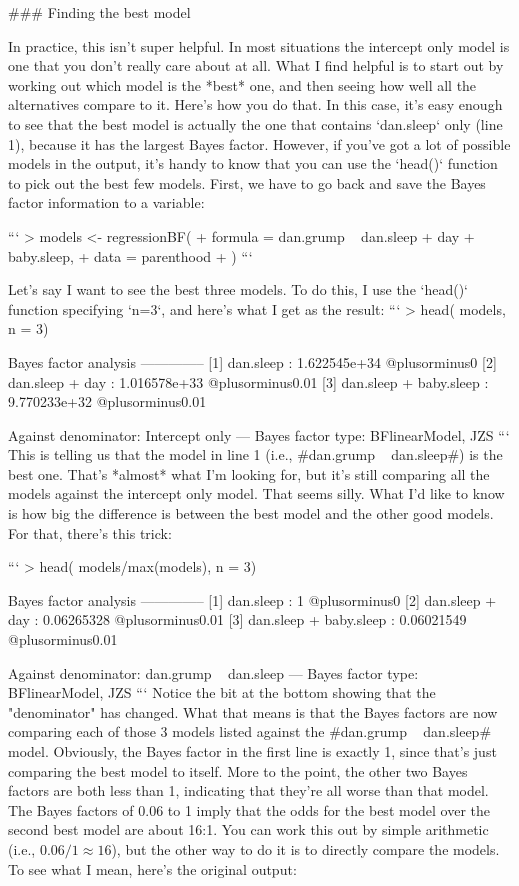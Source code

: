 ### Finding the best model

In practice, this isn't super helpful. In most situations the intercept only model is one that you don't really care about at all. What I find helpful is to start out by working out which model is the *best* one, and then seeing how well all the alternatives compare to it. Here's how you do that. In this case, it's easy enough to see that the best model is actually the one that contains `dan.sleep` only (line 1), because it has the largest Bayes factor. However, if you've got a lot of possible models in the output, it's handy to know that you can use the `head()` function to pick out the best few models. First, we have to go back and save the Bayes factor information to a variable:

```
> models <- regressionBF(
+    formula = dan.grump ~ dan.sleep + day + baby.sleep,
+    data = parenthood
+ )
```


Let's say I want to see the best three models. To do this, I use the `head()` function specifying `n=3`, and here's what I get as the result:
```
> head( models, n = 3)

Bayes factor analysis
--------------
[1] dan.sleep              : 1.622545e+34 @plusorminus0%
[2] dan.sleep + day        : 1.016578e+33 @plusorminus0.01%
[3] dan.sleep + baby.sleep : 9.770233e+32 @plusorminus0.01%

Against denominator:
  Intercept only 
---
Bayes factor type: BFlinearModel, JZS
```
This is telling us that the model in line 1 (i.e., \rtextverb#dan.grump ~ dan.sleep#) is the best one. That's *almost* what I'm looking for, but it's still comparing all the models against the intercept only model. That seems silly. What I'd like to know is how big the difference is between the best model and the other good models. For that, there's this trick:



```
> head( models/max(models), n = 3)

Bayes factor analysis
--------------
[1] dan.sleep              : 1          @plusorminus0%
[2] dan.sleep + day        : 0.06265328 @plusorminus0.01%
[3] dan.sleep + baby.sleep : 0.06021549 @plusorminus0.01%

Against denominator:
  dan.grump ~ dan.sleep 
---
Bayes factor type: BFlinearModel, JZS
```
Notice the bit at the bottom showing that the "denominator" has changed. What that means is that the Bayes factors are now comparing each of those 3 models listed against the \rtextverb#dan.grump ~ dan.sleep# model. Obviously, the Bayes factor in the first line is exactly 1, since that's just comparing the best model to itself. More to the point, the other two Bayes factors are both less than 1, indicating that they're all worse than that model. The Bayes factors of 0.06 to 1 imply that the odds for the best model over the second best model are about 16:1. You can work this out by simple arithmetic (i.e., $0.06 / 1 \approx 16$), but the other way to do it is to directly compare the models. To see what I mean, here's the original output:

